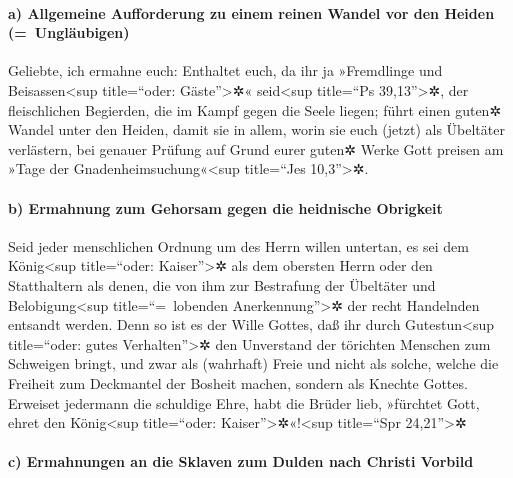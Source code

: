 \hypertarget{a-allgemeine-aufforderung-zu-einem-reinen-wandel-vor-den-heiden-ungluxe4ubigen}{%
\paragraph{a) Allgemeine Aufforderung zu einem reinen Wandel vor den
Heiden
(=~Ungläubigen)}\label{a-allgemeine-aufforderung-zu-einem-reinen-wandel-vor-den-heiden-ungluxe4ubigen}}

 Geliebte, ich ermahne euch: Enthaltet euch, da ihr ja
»Fremdlinge und Beisassen\textless sup title=``oder:
Gäste''\textgreater✲« seid\textless sup title=``Ps 39,13''\textgreater✲,
der fleischlichen Begierden, die im Kampf gegen die Seele liegen;
 führt einen guten✲ Wandel unter den Heiden, damit sie in
allem, worin sie euch (jetzt) als Übeltäter verlästern, bei genauer
Prüfung auf Grund eurer guten✲ Werke Gott preisen am »Tage der
Gnadenheimsuchung«\textless sup title=``Jes 10,3''\textgreater✲.

\hypertarget{b-ermahnung-zum-gehorsam-gegen-die-heidnische-obrigkeit}{%
\paragraph{b) Ermahnung zum Gehorsam gegen die heidnische
Obrigkeit}\label{b-ermahnung-zum-gehorsam-gegen-die-heidnische-obrigkeit}}

 Seid jeder menschlichen Ordnung um des Herrn willen
untertan, es sei dem König\textless sup title=``oder:
Kaiser''\textgreater✲ als dem obersten Herrn  oder den
Statthaltern als denen, die von ihm zur Bestrafung der Übeltäter und
Belobigung\textless sup title=``=~lobenden Anerkennung''\textgreater✲
der recht Handelnden entsandt werden.  Denn so ist es der
Wille Gottes, daß ihr durch Gutestun\textless sup title=``oder: gutes
Verhalten''\textgreater✲ den Unverstand der törichten Menschen zum
Schweigen bringt,  und zwar als (wahrhaft) Freie und
nicht als solche, welche die Freiheit zum Deckmantel der Bosheit machen,
sondern als Knechte Gottes.  Erweiset jedermann die
schuldige Ehre, habt die Brüder lieb, »fürchtet Gott, ehret den
König\textless sup title=``oder: Kaiser''\textgreater✲«!\textless sup
title=``Spr 24,21''\textgreater✲

\hypertarget{c-ermahnungen-an-die-sklaven-zum-dulden-nach-christi-vorbild}{%
\paragraph{c) Ermahnungen an die Sklaven zum Dulden nach Christi
Vorbild}\label{c-ermahnungen-an-die-sklaven-zum-dulden-nach-christi-vorbild}}

